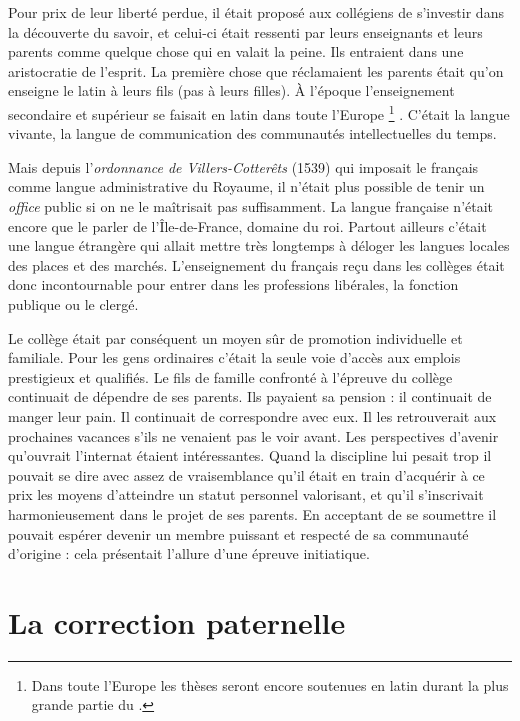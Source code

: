  Pour prix de leur liberté perdue, il était proposé aux collégiens de s'investir dans la découverte du savoir, et celui-ci était ressenti par leurs enseignants et leurs parents comme quelque chose qui en valait la peine. Ils entraient dans une aristocratie de l'esprit. La première chose que réclamaient les parents était qu'on enseigne le latin à leurs fils (pas à leurs filles). À l'époque l'enseignement secondaire et supérieur se faisait en latin dans toute l'Europe%
\footnote{Dans toute l'Europe les thèses seront encore soutenues en latin durant la plus grande partie du .}%
. C'était la langue vivante, la langue de communication des communautés intellectuelles du temps. 

 Mais depuis l'\emph{ordonnance de Villers-Cotterêts} (1539) qui imposait le français comme langue administrative du Royaume, il n'était plus possible de tenir un \emph{office} public si on ne le maîtrisait pas suffisamment. La langue française n'était encore que le parler de l'Île-de-France, domaine du roi. Partout ailleurs c'était une langue étrangère qui allait mettre très longtemps à déloger les langues locales des places et des marchés. L'enseignement du français reçu dans les collèges était donc incontournable pour entrer dans les professions libérales, la fonction publique ou le clergé. 

 Le collège était par conséquent un moyen sûr de promotion individuelle et familiale. Pour les gens ordinaires c'était la seule voie d'accès aux emplois prestigieux et qualifiés. Le fils de famille confronté à l'épreuve du collège continuait de dépendre de ses parents. Ils payaient sa pension : il continuait de manger leur pain. Il continuait de correspondre avec eux. Il les retrouverait aux prochaines vacances s'ils ne venaient pas le voir avant. Les perspectives d'avenir qu'ouvrait l'internat étaient intéressantes. Quand la discipline lui pesait trop il pouvait se dire avec assez de vraisemblance qu'il était en train d'acquérir à ce prix les moyens d'atteindre un statut personnel valorisant, et qu'il s'inscrivait harmonieusement dans le projet de ses parents. En acceptant de se soumettre il pouvait espérer devenir un membre puissant et respecté de sa communauté d'origine : cela présentait l'allure d'une épreuve initiatique. 

\section{La correction paternelle}

